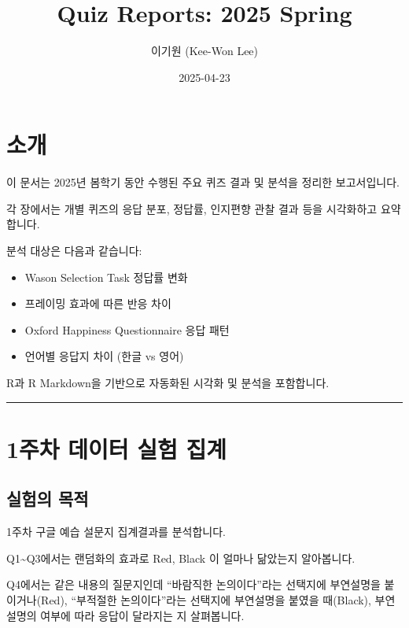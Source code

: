 \documentclass[
]{book}
\title{Quiz Reports: 2025 Spring}
\author{이기원 (Kee-Won Lee)}
\date{2025-04-23}
\providecommand{\tightlist}{%
  \setlength{\itemsep}{0pt}\setlength{\parskip}{0pt}}
\begin{document}
\maketitle

{
\setcounter{tocdepth}{1}
\tableofcontents
}
\chapter{소개}\label{uxc18cuxac1c}

이 문서는 2025년 봄학기 동안 수행된 주요 퀴즈 결과 및 분석을 정리한 보고서입니다.

각 장에서는 개별 퀴즈의 응답 분포, 정답률, 인지편향 관찰 결과 등을 시각화하고 요약합니다.

분석 대상은 다음과 같습니다:

\begin{itemize}
\tightlist
\item
  Wason Selection Task 정답률 변화
\item
  프레이밍 효과에 따른 반응 차이
\item
  Oxford Happiness Questionnaire 응답 패턴
\item
  언어별 응답지 차이 (한글 vs 영어)
\end{itemize}

R과 R Markdown을 기반으로 자동화된 시각화 및 분석을 포함합니다.

\begin{center}\rule{0.5\linewidth}{0.5pt}\end{center}

\chapter{1주차 데이터 실험 집계}\label{uxc8fcuxcc28-uxb370uxc774uxd130-uxc2e4uxd5d8-uxc9d1uxacc4}

\section{실험의 목적}\label{uxc2e4uxd5d8uxc758-uxbaa9uxc801}

1주차 구글 예습 설문지 집계결과를 분석합니다.

Q1\textasciitilde Q3에서는 랜덤화의 효과로 Red, Black 이 얼마나 닮았는지 알아봅니다.

Q4에서는 같은 내용의 질문지인데 ``바람직한 논의이다''라는 선택지에 부연설명을 붙이거나(Red), ``부적절한 논의이다''라는 선택지에 부연설명을 붙였을 때(Black), 부연설명의 여부에 따라 응답이 달라지는 지 살펴봅니다.
\end{document}
